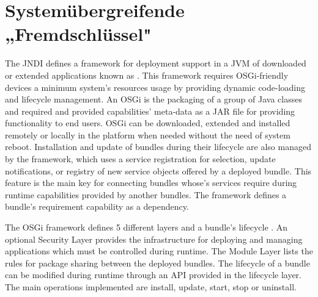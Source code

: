 \section{Systemübergreifende „Fremdschlüssel"}
\label{sec:SystemübergreifendeFremdschlüssel}

The \ac{JNDI} defines a framework for deployment support in a \ac{JVM} of downloaded or extended applications known as . This framework requires OSGi-friendly devices a minimum system's resources usage by providing dynamic code-loading and  lifecycle management. An \ac{OSGi}  is the packaging of a group of Java classes and required and provided capabilities' meta-data as a JAR file for providing functionality to end users. \ac{OSGi}  can be downloaded, extended and installed remotely or locally in the platform when needed without the need of system reboot. Installation and update of bundles during their lifecycle are also managed by the framework, which uses a service registration for selection, update notifications, or registry of new service objects offered by a deployed bundle. This feature is the main key for connecting bundles whose's services require during runtime capabilities provided by another bundles. The framework defines a bundle's requirement capability as a dependency.      

The \ac{OSGi} framework defines 5 different layers and a bundle's lifecycle \cite{OSGi2011}. An optional Security Layer provides the infrastructure for deploying and managing applications which must be controlled during runtime. The Module Layer lists the rules for package sharing between the deployed bundles. The lifecycle of a bundle can be modified during runtime through an API provided in the lifecycle layer. The main operations implemented are install, update, start, stop or uninstall. 
